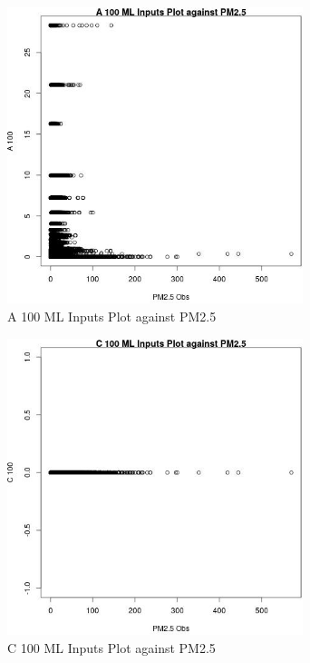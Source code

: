 \begin{figure} 
\centering  
\includegraphics[width=0.77\textwidth]{Code_Outputs/ML_input_report_ML_input_PM25_Step5_part_d_de_duplicated_aves_ML_input_A_100vPM25_Obs.jpg} 
\caption{\label{fig:ML_input_report_ML_input_PM25_Step5_part_d_de_duplicated_aves_ML_inputA_100vPM25_Obs}A 100 ML Inputs Plot against PM2.5} 
\end{figure} 
 

\begin{figure} 
\centering  
\includegraphics[width=0.77\textwidth]{Code_Outputs/ML_input_report_ML_input_PM25_Step5_part_d_de_duplicated_aves_ML_input_C_100vPM25_Obs.jpg} 
\caption{\label{fig:ML_input_report_ML_input_PM25_Step5_part_d_de_duplicated_aves_ML_inputC_100vPM25_Obs}C 100 ML Inputs Plot against PM2.5} 
\end{figure} 
 

